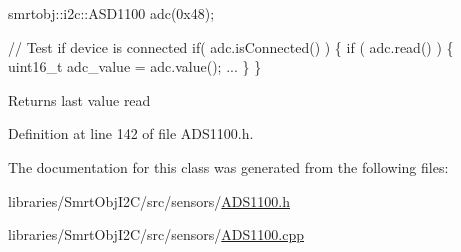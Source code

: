 \begin{DoxyCode}
smrtobj::i2c::ASD1100 adc(0x48);

\textcolor{comment}{// Test if device is connected }
\textcolor{keywordflow}{if}( adc.isConnected() )
\{
  \textcolor{keywordflow}{if} ( adc.read() )
  \{
    uint16\_t adc\_value = adc.value();
    ...
  \}
\}
\end{DoxyCode}


\begin{DoxyReturn}{Returns}
last value read 
\end{DoxyReturn}


Definition at line 142 of file A\+D\+S1100.\+h.



The documentation for this class was generated from the following files\+:\begin{DoxyCompactItemize}
\item 
libraries/\+Smrt\+Obj\+I2\+C/src/sensors/\hyperlink{_a_d_s1100_8h}{A\+D\+S1100.\+h}\item 
libraries/\+Smrt\+Obj\+I2\+C/src/sensors/\hyperlink{_a_d_s1100_8cpp}{A\+D\+S1100.\+cpp}\end{DoxyCompactItemize}
